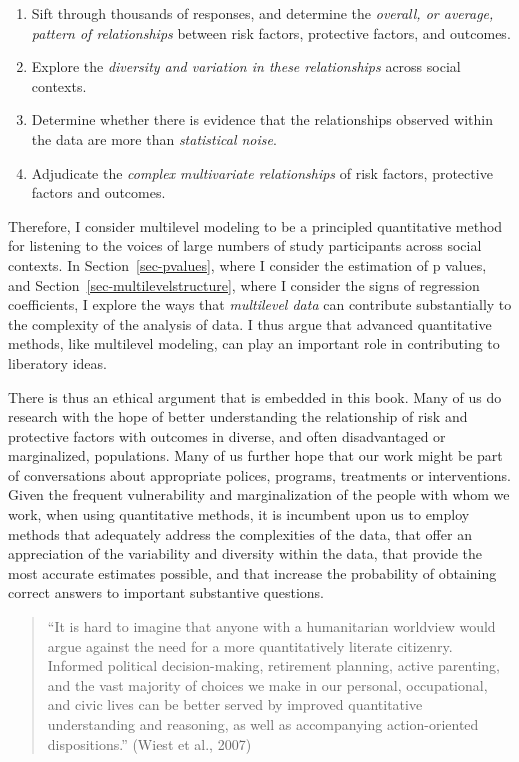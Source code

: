 \documentclass[
  letterpaper,
  DIV=11,
  numbers=noendperiod]{scrreprt}
\providecommand{\tightlist}{%
  \setlength{\itemsep}{0pt}\setlength{\parskip}{0pt}}\usepackage{longtable,booktabs,array}
\begin{document}
\begin{enumerate}
\def\labelenumi{\arabic{enumi}.}
\tightlist
\item
  Sift through thousands of responses, and determine the \emph{overall,
  or average, pattern of relationships} between risk factors, protective
  factors, and outcomes.
\item
  Explore the \emph{diversity and variation in these relationships}
  across social contexts.
\item
  Determine whether there is evidence that the relationships observed
  within the data are more than \emph{statistical noise}.
\item
  Adjudicate the \emph{complex multivariate relationships} of risk
  factors, protective factors and outcomes.
\end{enumerate}

Therefore, I consider multilevel modeling to be a principled
quantitative method for listening to the voices of large numbers of
study participants across social contexts. In Section~\ref{sec-pvalues},
where I consider the estimation of p values, and
Section~\ref{sec-multilevelstructure}, where I consider the signs of
regression coefficients, I explore the ways that \emph{multilevel data}
can contribute substantially to the complexity of the analysis of data.
I thus argue that advanced quantitative methods, like multilevel
modeling, can play an important role in contributing to liberatory
ideas.

There is thus an ethical argument that is embedded in this book. Many of
us do research with the hope of better understanding the relationship of
risk and protective factors with outcomes in diverse, and often
disadvantaged or marginalized, populations. Many of us further hope that
our work might be part of conversations about appropriate polices,
programs, treatments or interventions. Given the frequent vulnerability
and marginalization of the people with whom we work, when using
quantitative methods, it is incumbent upon us to employ methods that
adequately address the complexities of the data, that offer an
appreciation of the variability and diversity within the data, that
provide the most accurate estimates possible, and that increase the
probability of obtaining correct answers to important substantive
questions.

\begin{quote}
``It is hard to imagine that anyone with a humanitarian worldview would
argue against the need for a more quantitatively literate citizenry.
Informed political decision-making, retirement planning, active
parenting, and the vast majority of choices we make in our personal,
occupational, and civic lives can be better served by improved
quantitative understanding and reasoning, as well as accompanying
action-oriented dispositions.'' (Wiest et al., 2007)
\end{quote}
\end{document}
